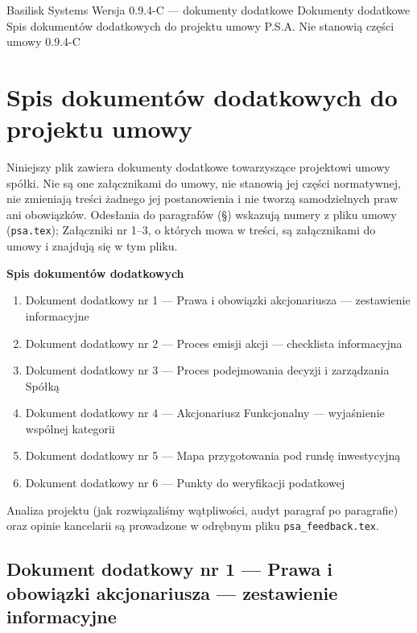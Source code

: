 \documentclass[12pt,a4paper]{report}
\newcounter{paragraf}
\begin{document}
\BusinessPlanTitlePage
  {Basilisk Systems}
  {Wersja 0.9.4-C --- dokumenty dodatkowe}
  {Dokumenty dodatkowe}
  {Spis dokumentów dodatkowych do projektu umowy P.S.A.}
  {Nie stanowią części umowy}
  {0.9.4-C}

\tableofcontents
\newpage

\chapter*{Spis dokumentów dodatkowych do projektu umowy}

Niniejszy plik zawiera dokumenty dodatkowe towarzyszące projektowi umowy spółki. Nie są one załącznikami do umowy, nie stanowią jej części normatywnej, nie zmieniają treści żadnego jej postanowienia i nie tworzą samodzielnych praw ani obowiązków. Odesłania do paragrafów (§) wskazują numery z pliku umowy (\texttt{psa.tex}); Załączniki nr 1--3, o których mowa w treści, są załącznikami do umowy i znajdują się w tym pliku.

\textbf{Spis dokumentów dodatkowych}
\begin{enumerate}
  \item Dokument dodatkowy nr 1 — Prawa i obowiązki akcjonariusza — zestawienie informacyjne
  \item Dokument dodatkowy nr 2 — Proces emisji akcji — checklista informacyjna
  \item Dokument dodatkowy nr 3 — Proces podejmowania decyzji i zarządzania Spółką
  \item Dokument dodatkowy nr 4 — Akcjonariusz Funkcjonalny — wyjaśnienie wspólnej kategorii
  \item Dokument dodatkowy nr 5 — Mapa przygotowania pod rundę inwestycyjną
  \item Dokument dodatkowy nr 6 — Punkty do weryfikacji podatkowej
\end{enumerate}

Analiza projektu (jak rozwiązaliśmy wątpliwości, audyt paragraf po paragrafie) oraz opinie kancelarii są prowadzone w odrębnym pliku \texttt{psa\_feedback.tex}.

\clearpage
\section*{Dokument dodatkowy nr 1 — Prawa i obowiązki akcjonariusza — zestawienie informacyjne}
\label{annex:obowiazki-akcjonariusza}
\end{document}
